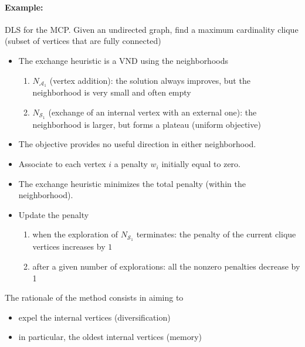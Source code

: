 \newpage

\paragraph{Example:} DLS for the MCP. Given an undirected graph, find a maximum cardinality clique (subset of vertices that are fully connected)
\begin{itemize}
	\item The exchange heuristic is a VND using the neighborhoods
	\begin{enumerate}
		\item $N_{\mathcal{A}_1}$ (vertex addition): the solution always improves, but the neighborhood is very small and often empty
		
		\item $N_{\mathcal{S}_1}$ (exchange of an internal vertex with an external one): the neighborhood is larger, but forms a plateau (uniform objective)
	\end{enumerate}
	\nn
	
	\item The objective provides no useful direction in either neighborhood.\\
	
	\item Associate to each vertex $i$ a penalty $w_i$ initially equal to zero.\\
	
	\item The exchange heuristic minimizes the total penalty (within the neighborhood).\\
	
	\item Update the penalty
	\begin{enumerate}
		\item when the exploration of $N_{\mathcal{S}_1}$ terminates: the penalty of the current clique vertices increases by $1$
		
		\item after a given number of explorations: all the nonzero penalties decrease by 1
	\end{enumerate}
	\nn
\end{itemize}

The rationale of the method consists in aiming to
\begin{itemize}
	\item expel the internal vertices (diversification)
	\item in particular, the oldest internal vertices (memory)
\end{itemize}

